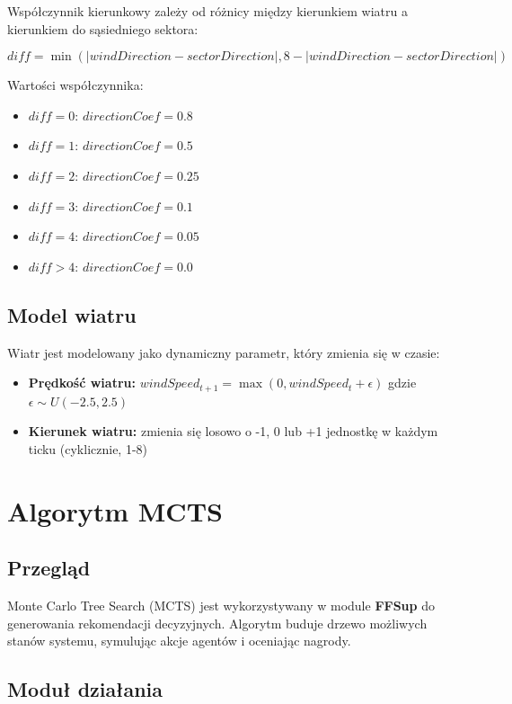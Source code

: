 \documentclass[11pt,a4paper]{article}
\begin{document}
Współczynnik kierunkowy zależy od różnicy między kierunkiem wiatru a kierunkiem do sąsiedniego sektora:

\begin{equation}
diff = \min(|windDirection - sectorDirection|, 8 - |windDirection - sectorDirection|)
\end{equation}

Wartości współczynnika:
\begin{itemize}
    \item $diff = 0$: $directionCoef = 0.8$
    \item $diff = 1$: $directionCoef = 0.5$
    \item $diff = 2$: $directionCoef = 0.25$
    \item $diff = 3$: $directionCoef = 0.1$
    \item $diff = 4$: $directionCoef = 0.05$
    \item $diff > 4$: $directionCoef = 0.0$
\end{itemize}

\subsection{Model wiatru}

Wiatr jest modelowany jako dynamiczny parametr, który zmienia się w czasie:

\begin{itemize}
    \item \textbf{Prędkość wiatru:} $windSpeed_{t+1} = \max(0, windSpeed_t + \epsilon)$ gdzie $\epsilon \sim U(-2.5, 2.5)$
    \item \textbf{Kierunek wiatru:} zmienia się losowo o -1, 0 lub +1 jednostkę w każdym ticku (cyklicznie, 1-8)
\end{itemize}

\section{Algorytm MCTS}

\subsection{Przegląd}

Monte Carlo Tree Search (MCTS) jest wykorzystywany w module \textbf{FFSup} do generowania rekomendacji decyzyjnych. Algorytm buduje drzewo możliwych stanów systemu, symulując akcje agentów i oceniając nagrody.

\subsection{Moduł działania}
\end{document}
